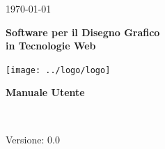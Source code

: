 \usepackage{multirow}
\title{\TITOLODOC}
\author{Marco Cunico}



\renewcommand{\insertversion}{0.0} %
\renewcommand{\TITOLODOC}{Manuale Utente} %
\renewcommand{\glosspath}{.\glossario} %

\begin{titlepage}
\begin{center}
	\begin{Large}	\today \end{Large}
\end{center}

\vspace{20pt}

\begin{center}
	\begin{Huge}
				\textbf{\ajax}
	\end{Huge}
\end{center}			

\begin{center}
	\begin{large}
				\textbf{Software per il Disegno Grafico\\ in Tecnologie Web}
	\end{large}
\end{center}			

\vspace{20pt}

\begin{center}
\texttt{[image: ../logo/logo]}
\end{center}

\vspace{170pt}
\begin{center} %
	\begin{Huge}
				\textbf{\TITOLODOC}
	\end{Huge}
			\\
\end{center}
\vspace{190pt}
\begin{center}
Versione: \insertversion
\end{center}
\end{titlepage}

\newpage

